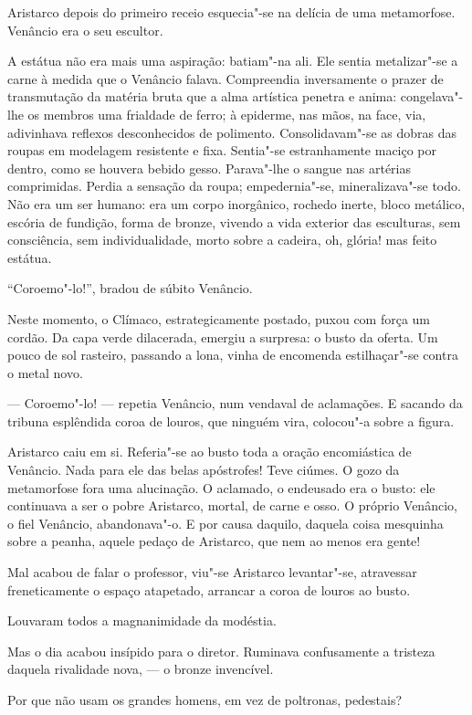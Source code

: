 Aristarco depois do primeiro receio esquecia"-se na delícia de uma
metamorfose. Venâncio era o seu escultor. 

A estátua não era mais uma
aspiração: batiam"-na ali. Ele sentia metalizar"-se a carne à medida
que o Venâncio falava. Compreendia inversamente o prazer de
transmutação da matéria bruta que a alma artística penetra e anima:
congelava"-lhe os membros uma frialdade de ferro; à epiderme, nas
mãos, na face, via, adivinhava reflexos desconhecidos de polimento.
Consolidavam"-se as dobras das roupas em modelagem resistente e fixa.
Sentia"-se estranhamente maciço por dentro, como se houvera bebido
gesso. Parava"-lhe o sangue nas artérias comprimidas. Perdia a
sensação da roupa; empedernia"-se, mineralizava"-se todo. Não era um
ser humano: era um corpo inorgânico, rochedo inerte, bloco metálico,
escória de fundição, forma de bronze, vivendo a vida exterior das
esculturas, sem consciência, sem individualidade, morto sobre a
cadeira, oh, glória! mas feito estátua. 

``Coroemo"-lo!'', bradou de súbito Venâncio. 

Neste momento, o Clímaco, estrategicamente postado,
puxou com força um cordão. Da capa verde dilacerada, emergiu a
surpresa: o busto da oferta. Um pouco de sol rasteiro, passando a lona,
vinha de encomenda estilhaçar"-se contra o metal novo. 

--- Coroemo"-lo! --- repetia Venâncio, num vendaval de aclamações. E sacando
da tribuna esplêndida coroa de louros, que ninguém vira, colocou"-a
sobre a figura. 

Aristarco caiu em si. Referia"-se ao busto toda a
oração encomiástica de Venâncio. Nada para ele das belas apóstrofes!
Teve ciúmes. O gozo da metamorfose fora uma alucinação. O aclamado, o
endeusado era o busto: ele continuava a ser o pobre Aristarco, mortal,
de carne e osso. O próprio Venâncio, o fiel Venâncio, abandonava"-o. E
por causa daquilo, daquela coisa mesquinha sobre a peanha, aquele
pedaço de Aristarco, que nem ao menos era gente! 

Mal acabou de falar o
professor, viu"-se Aristarco levantar"-se, atravessar freneticamente
o espaço atapetado, arrancar a coroa de louros ao busto.

Louvaram todos a magnanimidade da modéstia. 

Mas o dia acabou insípido
para o diretor. Ruminava confusamente a tristeza daquela rivalidade
nova, --- o bronze invencível. 

Por que não usam os grandes homens, em
vez de poltronas, pedestais? 


